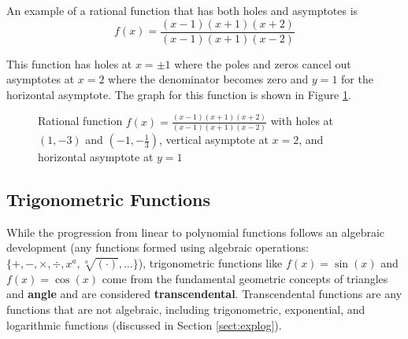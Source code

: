 \begin{example} An example of a rational function that has both holes and asymptotes is
    $$
    f(x) = \frac{(x-1)(x+1)(x+2)}{(x-1)(x+1)(x-2)}
    $$

    \noindent This function has holes at $x = \pm 1$ where the poles and zeros cancel out asymptotes at $x = 2$ where the denominator becomes zero and $y = 1$ for the horizontal asymptote. The graph for this function is shown in Figure \ref{fig:rationalholeandasymptote}.

    \begin{figure}[!ht]
        \centering
                \caption{Rational function $f(x) = \frac{(x-1)(x+1)(x+2)}{(x-1)(x+1)(x-2)}$ with holes at $(1,-3)$ and $(-1,-\frac{1}{3})$, vertical asymptote at $x=2$, and horizontal asymptote at $y=1$}
                \label{fig:rationalholeandasymptote}
            \end{figure}
        \end{example}

        \subsection{Trigonometric Functions}
        While the progression from linear to polynomial functions follows an algebraic development (any functions formed using algebraic operations: $\{+,-,\times,\div,x^a,\sqrt[a]{(\cdot)},\dots\}$), trigonometric functions like $f(x) = \sin(x)$ and $f(x) = \cos(x)$ come from the fundamental geometric concepts of triangles and \textbf{angle} and are considered \textbf{transcendental}. Transcendental functions are any functions that are not algebraic, including trigonometric, exponential, and logarithmic functions (discussed in Section \ref{sect:explog}).

